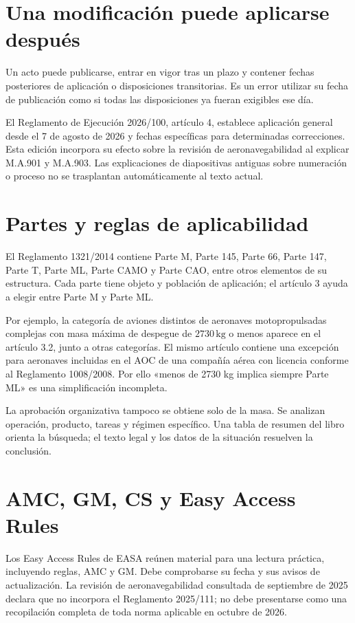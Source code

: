 \section{Una modificación puede aplicarse después}
Un acto puede publicarse, entrar en vigor tras un plazo y contener fechas posteriores de aplicación o disposiciones transitorias. Es un error utilizar su fecha de publicación como si todas las disposiciones ya fueran exigibles ese día.

El Reglamento de Ejecución 2026/100, artículo 4, establece aplicación general desde el 7 de agosto de 2026 y fechas específicas para determinadas correcciones. Esta edición incorpora su efecto sobre la revisión de aeronavegabilidad al explicar M.A.901 y M.A.903. Las explicaciones de diapositivas antiguas sobre numeración o proceso no se trasplantan automáticamente al texto actual.
\section{Partes y reglas de aplicabilidad}
El Reglamento 1321/2014 contiene Parte M, Parte 145, Parte 66, Parte 147, Parte T, Parte ML, Parte CAMO y Parte CAO, entre otros elementos de su estructura. Cada parte tiene objeto y población de aplicación; el artículo 3 ayuda a elegir entre Parte M y Parte ML.

Por ejemplo, la categoría de aviones distintos de aeronaves motopropulsadas complejas con masa máxima de despegue de $2730\,\mathrm{kg}$ o menos aparece en el artículo 3.2, junto a otras categorías. El mismo artículo contiene una excepción para aeronaves incluidas en el AOC de una compañía aérea con licencia conforme al Reglamento 1008/2008. Por ello «menos de 2730 kg implica siempre Parte ML» es una simplificación incompleta.

La aprobación organizativa tampoco se obtiene solo de la masa. Se analizan operación, producto, tareas y régimen específico. Una tabla de resumen del libro orienta la búsqueda; el texto legal y los datos de la situación resuelven la conclusión.
\section{AMC, GM, CS y Easy Access Rules}
Los Easy Access Rules de EASA reúnen material para una lectura práctica, incluyendo reglas, AMC y GM. Debe comprobarse su fecha y sus avisos de actualización. La revisión de aeronavegabilidad consultada de septiembre de 2025 declara que no incorpora el Reglamento 2025/111; no debe presentarse como una recopilación completa de toda norma aplicable en octubre de 2026.


